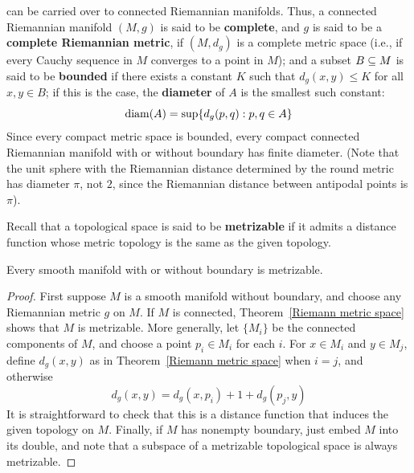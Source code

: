 can be carried over to connected Riemannian manifolds. Thus, a connected 
Riemannian manifold $(M,g)$ is said to be \textbf{complete}, and $g$ is 
said to be a \textbf{complete Riemannian metric}, if $(M,d_g)$ is a 
complete metric space (i.e., if every Cauchy sequence in $M$ converges 
to a point in $M$); and a subset $B\subseteq M$ is said to be \textbf{bounded} 
if there  exists a constant $K$ such that $d_g(x,y)\leq K$ for all 
$x,y\in B$; if this is the case, the \textbf{diameter} of $A$ is the smallest 
such constant:
\[\mathrm{diam}(A)=\sup\{d_g(p,q):p,q\in A\}\]
Since every compact metric space is bounded, every compact connected 
Riemannian manifold with or without boundary has finite diameter. 
(Note that the unit sphere with the Riemannian distance determined by 
the round metric has diameter $\pi$, not $2$, since the Riemannian distance 
between antipodal points is $\pi$).\par
Recall that a topological space is said to be \textbf{metrizable} if it 
admits a distance function whose metric topology is the same as the given 
topology.
\begin{corollary}
Every smooth manifold with or without boundary is metrizable.
\end{corollary}
\begin{proof}
First suppose $M$ is a smooth manifold without boundary, and choose any Riemannian metric $g$ on $M$. If $M$ is connected, Theorem~\ref{Riemann metric space} shows that $M$ is metrizable. More generally, let $\{M_i\}$ be the connected components of $M$, and choose a point $p_i\in M_i$ for each $i$. For $x\in M_i$ and $y\in M_j$, define $d_g(x,y)$ as in Theorem~\ref{Riemann metric space} when $i=j$, and otherwise
\[d_g(x,y)=d_g(x,p_i)+1+d_g(p_j,y)\]
It is straightforward to check that this is a distance function that induces the given topology on $M$. Finally, if $M$ has nonempty boundary, just embed $M$ into its double, and note that a subspace of a metrizable topological space is always metrizable.
\end{proof}
